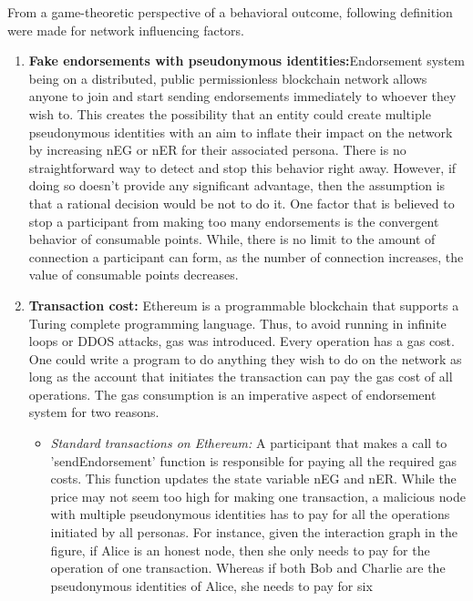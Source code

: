 From a game-theoretic perspective of a behavioral outcome, following
definition were made for network influencing factors. 

\begin{enumerate}
	\item \label{item:fakeeds} \textbf{Fake endorsements with pseudonymous
		identities:}Endorsement system being on a
		distributed, public permissionless blockchain network allows anyone to
		join and start sending endorsements immediately to whoever they wish
		to. This creates the possibility that an entity could create multiple
		pseudonymous identities with an aim to inflate their impact on the
		network by increasing nEG or nER for their associated persona.  There
		is no straightforward way to detect and stop this behavior right away.
		However, if doing so doesn't provide any significant advantage, then
		the assumption is that a rational decision would be not to do it.  One
		factor that is believed to stop a participant from making too many
		endorsements is the convergent behavior of consumable points. While,
		there is no limit to the amount of connection a participant can form,
		as the number of connection increases, the value of consumable points
		decreases. 
	\item \textbf{Transaction cost:} Ethereum is a programmable blockchain that
		supports a Turing complete programming language. Thus, to avoid running
		in infinite loops or DDOS attacks, gas was introduced. Every operation
		has a gas cost. One could write a program to do anything they wish to
		do on the network as long as the account that initiates the transaction
		can pay the gas cost of all operations. The gas consumption is an
		imperative aspect of endorsement system for two reasons. \\
		\begin{itemize}
			\item \textit{Standard transactions on Ethereum:} A participant
				that makes a call to 'sendEndorsement' function is responsible
				for paying all the required gas costs. This function updates
				the state variable nEG and nER. While the price may not seem
				too high for making one transaction, a malicious node with
				multiple pseudonymous identities has to pay for all the
				operations initiated by all personas. For instance, given the
				interaction graph in the figure, if Alice is an honest node,
				then she only needs to pay for the operation of one
				transaction. Whereas if both Bob and Charlie are the
				pseudonymous identities of Alice, she needs to pay for six

\end{itemize}
\end{enumerate}
